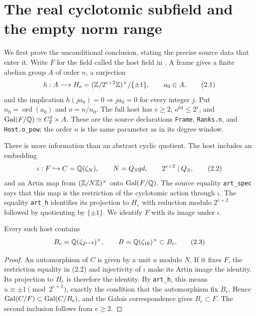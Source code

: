 \section{The real cyclotomic subfield and the empty norm range}
\label{sec:literal-small}

We first prove the unconditional conclusion, stating the precise source
data that enter it. Write $F$ for the field called the host field in
\citet{AlpogeLean2026}. A frame gives a finite abelian group $A$ of
order $n$, a surjection
\[
 h:A\longrightarrow H_e=(\mathbb Z/2^{e+2}\mathbb Z)^\times/\{\pm1\},
 \qquad a_0\in A,
                                                        \tag{2.1}
\]
and the implication $h(ja_0)=0\Rightarrow ja_0=0$ for every integer
$j$. Put $n_0=\operatorname{ord}(a_0)$ and $o=n/n_0$.
The full host has $e\ge2$, $o^{64}\le2^e$, and
$\operatorname{Gal}(F/\mathbb Q)\simeq C_2^2\times A$.
These are the source declarations \texttt{Frame}, \texttt{Ranks.n},
and \texttt{Host.o\_pow}; the order $n$ is the same parameter as
in its degree window.

There is more information than an abstract cyclic quotient. The
host includes an embedding
\[
 \iota:F\hookrightarrow C=\mathbb Q(\zeta_N),\qquad
 N=Q_Sqd,\qquad 2^{e+2}\mid Q_S,
                                                        \tag{2.2}
\]
and an Artin map from $(\mathbb Z/N\mathbb Z)^\times$ onto $\operatorname{Gal}(F/\mathbb Q)$.
The source equality \texttt{art\_spec} says that this map is the
restriction of the cyclotomic action through $\iota$.
The equality \texttt{art\_h} identifies its projection to $H_e$
with reduction modulo $2^{e+2}$ followed by quotienting by $\{\pm1\}$.
We identify $F$ with its image under $\iota$.

\begin{lemma}\label{lem:actual-cyclotomic}
Every such host contains
\[
       B_e=\mathbb Q(\zeta_{2^{e+2}})^+,
       \qquad B=\mathbb Q(\zeta_{16})^+\subset B_e.
                                                        \tag{2.3}
\]
\end{lemma}
\begin{proof}
An automorphism of $C$ is given by a unit $u$ modulo $N$.
If it fixes $F$, the restriction equality in (2.2) and injectivity
of $\iota$ make its Artin image the identity. Its projection to
$H_e$ is therefore the identity. By \texttt{art\_h}, this means
$u\equiv\pm1\pmod{2^{e+2}}$, exactly the condition that the
automorphism fix $B_e$. Hence
$\operatorname{Gal}(C/F)\subset\operatorname{Gal}(C/B_e)$, and the Galois correspondence
gives $B_e\subset F$. The second inclusion follows from $e\ge2$.
\end{proof}

